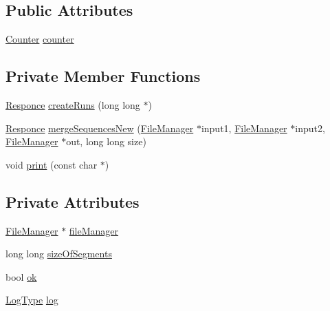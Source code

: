 \subsection*{Public Attributes}
\begin{DoxyCompactItemize}
\item 
\hyperlink{class_counter}{Counter} \hyperlink{class_external_merge_sort_ac9cb039a5cda56e66aecbc17465dd237}{counter}
\end{DoxyCompactItemize}
\subsection*{Private Member Functions}
\begin{DoxyCompactItemize}
\item 
\hyperlink{_structures_8h_a9864d6ef28dd6e38416afac4426b3491}{Responce} \hyperlink{class_external_merge_sort_a54203f48d659003f5a75425354d4e262}{create\+Runs} (long long $\ast$)
\item 
\hyperlink{_structures_8h_a9864d6ef28dd6e38416afac4426b3491}{Responce} \hyperlink{class_external_merge_sort_a8b4f951d9ee53818b8d3d4e84e2a1aa4}{merge\+Sequences\+New} (\hyperlink{class_file_manager}{File\+Manager} $\ast$input1, \hyperlink{class_file_manager}{File\+Manager} $\ast$input2, \hyperlink{class_file_manager}{File\+Manager} $\ast$out, long long size)
\item 
void \hyperlink{class_external_merge_sort_a5e19d768fb9ef81e36e22e2eff498ca4}{print} (const char $\ast$)
\end{DoxyCompactItemize}
\subsection*{Private Attributes}
\begin{DoxyCompactItemize}
\item 
\hyperlink{class_file_manager}{File\+Manager} $\ast$ \hyperlink{class_external_merge_sort_ab82d3b62a57be6c80dbd12b90de278e2}{file\+Manager}
\item 
long long \hyperlink{class_external_merge_sort_a1d68bb5e0373cf16807a41272dff1a99}{size\+Of\+Segments}
\item 
bool \hyperlink{class_external_merge_sort_a4b050cd230e144a11f65e57523e15ce6}{ok}
\item 
\hyperlink{_structures_8h_af67907baa897e9fb84df0cb89795b87c}{Log\+Type} \hyperlink{class_external_merge_sort_a41f61c3beb7dc529d7f2a8b2b4ee380b}{log}
\end{DoxyCompactItemize}



